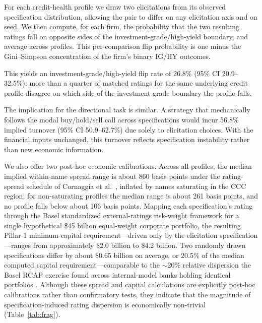 \documentclass[pdflatex,sn-nature,lineno]{sn-jnl}
\theoremstyle{thmstyleone}
\begin{document}
For each credit-health profile we draw two elicitations from its observed specification distribution,
allowing the pair to differ on any elicitation axis and on seed. We then compute, for each firm, the
probability that the two resulting ratings fall on opposite sides of the investment-grade/high-yield
boundary, and average across profiles. This per-comparison flip probability is one minus the
Gini--Simpson concentration of the firm's binary IG/HY outcomes.

This yields an investment-grade/high-yield flip rate of 26.8\% (95\% CI 20.9--32.5\%): more than a
quarter of matched ratings for the same underlying credit profile disagree on which side of the
investment-grade boundary the profile falls.

The implication for the directional task is similar. A strategy that mechanically follows the modal
buy/hold/sell call across specifications would incur 56.8\% implied turnover (95\% CI 50.9--62.7\%) due
solely to elicitation choices. With the financial inputs unchanged, this turnover reflects specification
instability rather than new economic information.

We also offer two post-hoc economic calibrations. Across all profiles, the median implied within-name
spread range is about 860 basis points under the rating-spread schedule of Cornaggia et
al.\ \cite{cornaggia2018}, inflated by names saturating in the CCC region; for non-saturating profiles
the median range is about 261 basis points, and no profile falls below about 106 basis points. Mapping
each specification's rating through the Basel standardized external-ratings risk-weight framework
\cite{bcbs2019cre20} for a single hypothetical \$45 billion equal-weight corporate portfolio, the
resulting Pillar-1 minimum-capital requirement---driven only by the elicitation specification---ranges
from approximately \$2.0 billion to \$4.2 billion. Two randomly drawn specifications differ by about
\$0.65 billion on average, or 20.5\% of the median computed capital requirement---comparable to the
$\sim$20\% relative dispersion the Basel RCAP exercise found across internal-model banks holding
identical portfolios \cite{bcbs2013rcap}. Although these spread and capital calculations are explicitly
post-hoc calibrations rather than confirmatory tests, they indicate that the magnitude of
specification-induced rating dispersion is economically non-trivial (Table~\ref{tab:frag}).
\end{document}
